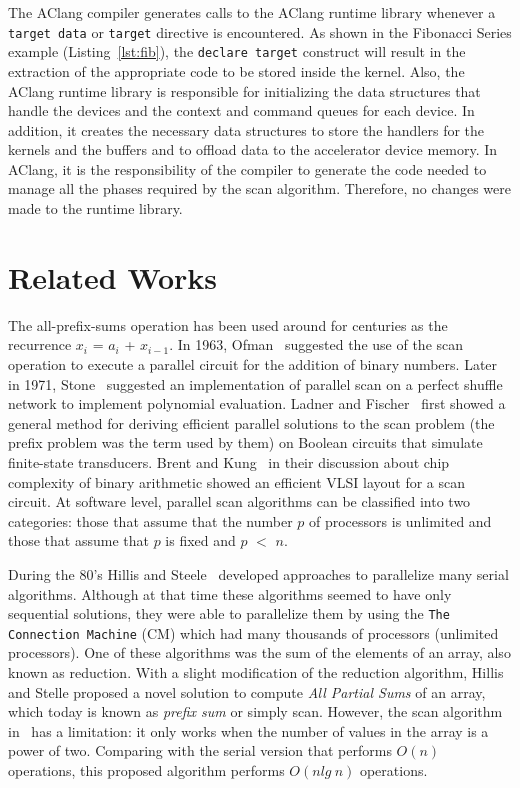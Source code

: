 \documentclass[Ingles]{ic-tese-v1}
\newcommand{\ttt}[1]{{\texttt{#1}}}
\newcommand{\tit}[1]{{\textit{#1}}}
\newcommand{\rlst}[1]{Listing~\ref{lst:#1}}
\begin{document}
The AClang compiler generates calls to  the AClang runtime library whenever a
\ttt{target data}  or \ttt{target}  directive is encountered.   As shown  in  the Fibonacci
Series example (\rlst{fib}),  the \ttt{declare  target}
construct will result in the extraction  of the appropriate code to be
stored  inside  the  kernel.  Also,  the  AClang  runtime  library  is
responsible for initializing the data  structures that handle the devices
and the context  and command queues for each device.   In addition, it
creates the  necessary data structures  to store the handlers  for the
kernels and the buffers and to offload data to the accelerator device
memory.  In AClang, it is the responsibility of the compiler to generate
the  code needed  to manage  all the  phases required by  the scan  algorithm.
Therefore, no changes were made to the runtime library.

\chapter{Related Works}
\label{cap:RelatedWorks}

The all-prefix-sums operation has been used around for centuries as the recurrence
$x_{i}$ = $a_{i}$ + $x_{i−1}$. In 1963, Ofman~\cite{Ofman:1962} suggested the use of the scan operation to execute a parallel circuit for the addition of binary numbers. Later in 1971, Stone~\cite{Stone:1971} suggested an implementation of parallel scan  on a perfect shuffle network to implement polynomial evaluation. Ladner and Fischer~\cite{Ladner:1980} first showed a general method for deriving efficient parallel solutions to the scan problem (the prefix problem was the term used by them) on Boolean circuits that simulate finite-state transducers. Brent and Kung~\cite{Brent:1981} in their discussion about chip complexity of binary arithmetic showed an efficient VLSI layout for a scan circuit.
At software level, parallel scan algorithms can be classified into two categories: those that assume that the number $p$ of processors is unlimited and those that assume that $p$ is fixed and $p$ $<$ $n$.

During  the 80's  Hillis and  Steele~\cite{dataparallel} developed
approaches to parallelize many serial algorithms. Although at that time
these algorithms  seemed to have only  sequential solutions, they were able to parallelize them by  using the
\ttt{The  Connection Machine}  (CM) \cite{themachine} which had many thousands of processors (unlimited processors). One of these algorithms was the sum of the elements of an  array, also known as  reduction.  With a slight modification of the reduction algorithm, Hillis and Stelle proposed a novel solution to compute \textit{All Partial Sums} of an array, which today  is known  as \tit{prefix sum} or simply scan. However, the scan algorithm in~\cite{dataparallel} has a limitation: it only works when the number of values in the array is a power of two. Comparing with the serial version that performs $O(n)$ operations, this proposed algorithm performs $O(n lg\ n)$ operations.
\end{document}
